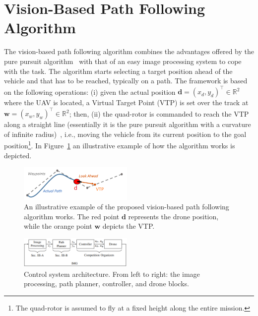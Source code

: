 \documentclass[a4paper,twocolumn,10pt]{article}
\begin{document}
    \section{Vision-Based Path Following Algorithm}
    \label{sec:VisBasedFollow}

    The vision-based path following algorithm combines the advantages offered by the pure pursuit algorithm~\cite{14_coulter1992implementation} with that of an easy image processing system to cope with the task. The algorithm starts selecting a target position ahead of the vehicle and that has to be reached, typically on a path. The framework is based on the following operations: (i) given 
    the actual position $\mathbf{d}=(x_d, y_d)^\top \in \mathbb{R}^2$ where the UAV is located, 
    a Virtual Target Point (VTP)  is set over the track at $\mathbf{w}=(x_w, y_w)^\top \in \mathbb{R}^2$; then, (ii) the quad-rotor is commanded to reach the VTP along a straight line (essentially it is the pure 
    pursuit algorithm with a curvature of infinite radius)~\cite{14_coulter1992implementation}, i.e., 
    moving the vehicle from its current position to the goal position\footnote{The quad-rotor is assumed to fly at a fixed height along the entire mission.}. 
    In Figure~\ref{fig:fig3path} an illustrative example of how the algorithm works is depicted. 

    \begin{figure}
        \centering
        \includegraphics[width=0.49\textwidth]{pics/fig3_path.png}
        \caption{An illustrative example of the proposed vision-based path following algorithm works. 
        The red point $\mathbf{d}$ represents the drone position, while the orange point $\mathbf{w}$ 
        depicts the VTP.}
        \label{fig:fig3path}
    \end{figure}
    \begin{figure}
        \centering
        \includegraphics[width=0.49\textwidth]{pics/fig4_frick.png}
        \caption{Control system architecture. From left to right: the image processing, path planner, 
        controller, and drone blocks.}
        \label{fig:fig4diagram}
    \end{figure}
\end{document}

